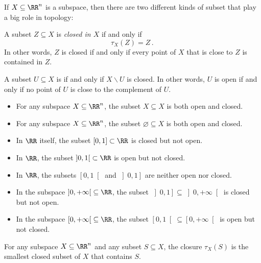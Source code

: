 If $X \subseteq \RR^n$ is a subspace, then there are two different kinds of subset that play a big role in topology:
\begin{dfn}
	A subset $Z \subseteq X$ is \emph{closed in $X$} if and only if
	\[
		\tau_X(Z) = Z \period
	\]
	In other words, $Z$ is closed if and only if every point of $X$ that is close to $Z$ is contained in $Z$.

	A subset $U \subseteq X$ is  if and only if $X \smallsetminus U $ is closed.
	In other words, $U$ is open if and only if no point of $U$ is close to the complement of $U$.
\end{dfn}

\begin{exm}
	\begin{itemize}
		\item For any subspace $X \subseteq \RR^n$, the subset $X \subseteq X$ is both open and closed.%
		\item For any subspace $X \subseteq \RR^n$, the subset $\varnothing \subseteq X $ is both open and closed.
		\item In $\RR$ itself, the subset $[0,1] \subset \RR$ is closed but not open.
		\item In $\RR$, the subset $\left]0,1\right[ \subset \RR$ is open but not closed.
		\item In $\RR$, the subsets $\left[0,1\right[$ and $\left]0,1\right]$ are neither open nor closed.
		\item In the subspace $\left]0, +\infty\right[ \subseteq \RR$, the subset $\left]0,1\right] \subseteq \left]0, +\infty\right[$ is closed but not open.
		\item In the subspace $\left[0, +\infty\right[ \subseteq \RR$, the subset $\left[0,1\right[ \subseteq \left[0, +\infty\right[$ is open but not closed.
	\end{itemize}
\end{exm}

\begin{prp}%
\label{prp:tau_is_smallest_closed}
	For any subspace $X \subseteq \RR^n$ and any subset $ S \subseteq X $, the closure $\tau_X(S)$ is the smallest closed subset%
of $X$ that contains $S$.
\end{prp}

